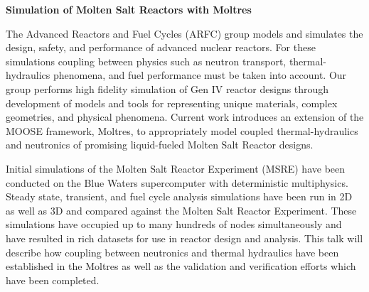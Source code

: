 \documentclass[11pt]{article}
\newcommand{\authorname}{Kathryn~D.~Huff }
\newcommand{\authorsite}{arfc.npre.illinois.edu}
\begin{document}
\pagestyle{fancy}
\lhead{\textcolor{gray}{Investigator: Prof. \authorname\\Presenter: Mr. Andrei Rykhlevskii}}
\rhead{\textcolor{gray}{University of Illinois at Urbana-Champaign\\}}
\renewcommand{\headrulewidth}{0pt}
\renewcommand{\footrulewidth}{0pt}
\fancyfoot[C]{\footnotesize \textcolor{gray}{\authorsite}}
   \begin{center}
      \Large\textbf{Simulation of Molten Salt Reactors with Moltres}\\
   \end{center}

The Advanced Reactors and Fuel Cycles (ARFC) group models and simulates the design, safety, and performance of advanced nuclear reactors. For these simulations coupling between physics such as neutron transport, thermal-hydraulics phenomena, and fuel performance must be taken into account. Our group performs high fidelity simulation of Gen IV reactor designs through development of models and tools for representing unique materials, complex geometries, and physical phenomena. Current work introduces an extension of the MOOSE framework, Moltres, to appropriately model coupled thermal-hydraulics and neutronics of promising liquid-fueled Molten Salt Reactor designs. 

Initial simulations of the Molten Salt Reactor Experiment (MSRE) have been conducted on the Blue Waters supercomputer with deterministic multiphysics. Steady state, transient, and fuel cycle analysis simulations have been run in 2D as well as 3D and compared against the Molten Salt Reactor Experiment. These simulations
have occupied up to many hundreds of nodes simultaneously and have resulted in rich datasets
for use in reactor design and analysis. This talk will describe how coupling between neutronics and thermal hydraulics have been established in the Moltres as well as the validation and verification efforts which have been completed. 
\end{document}
